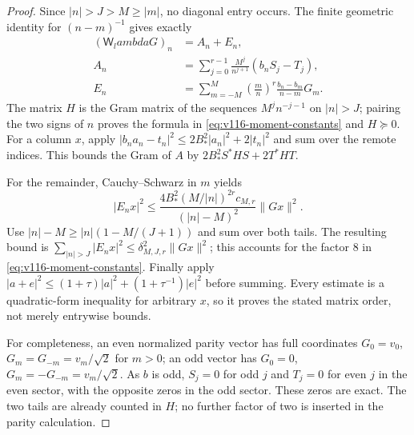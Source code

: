 \documentclass[11pt]{article}
\def\lambda{lambda}%
\theoremstyle{remark}
\begin{document}
\begin{proof}
Since $|n|>J>M\ge|m|$, no diagonal entry occurs.  The finite geometric
identity for $(n-m)^{-1}$ gives exactly
\begin{align*}
 (\mathsf W_\lambda G)_n&=A_n+E_n,\\
 A_n&=\sum_{j=0}^{r-1}\frac{M^j}{n^{j+1}}(b_nS_j-T_j),\\
 E_n&=\sum_{m=-M}^M\left(\frac mn\right)^r
                         \frac{b_n-b_m}{n-m}G_m.
\end{align*}
The matrix $H$ is the Gram matrix of the sequences
$M^j n^{-j-1}$ on $|n|>J$; pairing the two signs of $n$ proves the
formula in \eqref{eq:v116-moment-constants} and $H\succeq0$.
For a column $x$, apply
$|b_na_n-t_n|^2\le2B_*^2|a_n|^2+2|t_n|^2$ and sum over the remote
indices.  This bounds the Gram of $A$ by
$2B_*^2S^*HS+2T^*HT$.

For the remainder, Cauchy--Schwarz in $m$ yields
\[
 |E_nx|^2\le
 \frac{4B_*^2(M/|n|)^{2r}c_{M,r}}{(|n|-M)^2}\|Gx\|^2.
\]
Use $|n|-M\ge|n|(1-M/(J+1))$ and sum over both tails.
The resulting bound is
$\sum_{|n|>J}|E_nx|^2\le\delta_{M,J,r}^{2}\|Gx\|^2$;
this accounts for the factor $8$ in
\eqref{eq:v116-moment-constants}.  Finally apply
$|a+e|^2\le(1+\tau)|a|^2+(1+\tau^{-1})|e|^2$ before summing.
Every estimate is a quadratic-form inequality for arbitrary $x$, so
it proves the stated matrix order, not merely entrywise bounds.

For completeness, an even normalized parity vector has full
coordinates $G_0=v_0$, $G_m=G_{-m}=v_m/\sqrt2$ for $m>0$;
an odd vector has $G_0=0$, $G_m=-G_{-m}=v_m/\sqrt2$.
As $b$ is odd, $S_j=0$ for odd $j$ and $T_j=0$ for even $j$ in the
even sector, with the opposite zeros in the odd sector.
These zeros are exact.  The two tails are already counted in $H$;
no further factor of two is inserted in the parity calculation.
\end{proof}
\end{document}

